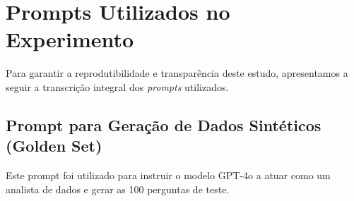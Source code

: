 \appendix

\section{Prompts Utilizados no Experimento}
\label{apendice:prompts}

Para garantir a reprodutibilidade e transparência deste estudo, apresentamos a seguir a transcrição integral dos \textit{prompts} utilizados.

\subsection{Prompt para Geração de Dados Sintéticos (Golden Set)}
Este prompt foi utilizado para instruir o modelo GPT-4o a atuar como um analista de dados e gerar as 100 perguntas de teste.

